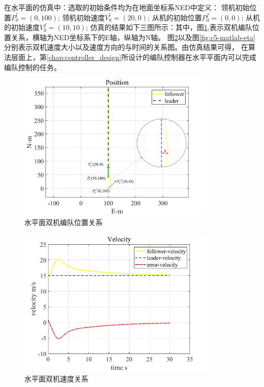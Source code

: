 在水平面的仿真中：选取的初始条件均为在地面坐标系NED中定义：
领机初始位置$P_{0}^{l}=(0,100)$;
领机初始速度$V_{0}^{l}=(20,0)$;
从机的初始位置$P_{0}^{f}=(0,0)$;
从机的初始速度$V_{0}^{f}=(10,10)$;
仿真的结果如下三图所示：其中，图\ref{fig:c5-matlab-pos},表示双机编队位置关系，横轴为NED坐标系下的E轴，纵轴为N轴。
图\ref{fig:c5-matlab-vel}以及图\ref{fig:c5-matlab-eta}分别表示双机速度大小以及速度方向的与时间的关系图。由仿真结果可得，
在算法层面上，第\ref{chap:controller_design}所设计的编队控制器在水平平面内可以完成编队控制的任务。
\begin{figure}[H]
    \centering
    \includegraphics[width=0.85\textwidth]{figures/c5/c5-matlab-pos.png}
    \caption{水平面双机编队位置关系}\label{fig:c5-matlab-pos}
\end{figure}
\begin{figure}[H]
    \centering
    \includegraphics[width=0.85\textwidth]{figures/c5/c5-matlab-vel.jpg}
    \caption{水平面双机速度关系}\label{fig:c5-matlab-vel}
\end{figure}
